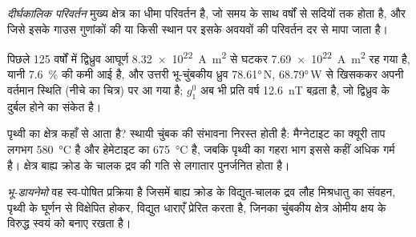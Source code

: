 \begin{definition}[दीर्घकालिक परिवर्तन]\label{def:b3:palaeomagnetism:secular}
\emph{दीर्घकालिक परिवर्तन} मुख्य क्षेत्र का धीमा परिवर्तन है, जो
समय के साथ वर्षों से सदियों तक होता है, और जिसे इसके गाउस गुणांकों की या
किसी स्थान पर इसके अवयवों की परिवर्तन दर से मापा जाता है।
\end{definition}

पिछले 125 वर्षों में द्विध्रुव आघूर्ण
\qty{8.32e22}{A.m^2} से घटकर \qty{7.69e22}{A.m^2} रह गया है, यानी \qty{7.6}{\percent} की कमी आई है, और उत्तरी भू-चुंबकीय ध्रुव
\ang{78.61}\,N, \ang{68.79}\,W से खिसककर अपनी
वर्तमान स्थिति (नीचे का चित्र) पर आ गया है; $g_1^0$ अब भी प्रति वर्ष \qty{12.6}{nT} बढ़ता है,
जो द्विध्रुव के दुर्बल होने का संकेत है।

\begin{omfigure}

\par{}\label{fig:b3:palaeomagnetism:dipole}
\end{omfigure}

पृथ्वी का क्षेत्र कहाँ से आता है? स्थायी चुंबक की संभावना निरस्त होती है: मैग्नेटाइट का
क्यूरी ताप लगभग \qty{580}{\celsius} है और हेमेटाइट का
\qty{675}{\celsius} है, जबकि पृथ्वी का गहरा भाग इससे कहीं अधिक गर्म है।
क्षेत्र बाह्य क्रोड के चालक द्रव की
गति से लगातार पुनर्जनित होता है।

\begin{definition}[भू-डायनेमो]\label{def:b3:palaeomagnetism:geodynamo}
\emph{भू-डायनेमो} वह स्व-पोषित प्रक्रिया है जिसमें
बाह्य क्रोड के विद्युत-चालक द्रव लौह मिश्रधातु का संवहन,
पृथ्वी के घूर्णन से विक्षेपित होकर, विद्युत धाराएँ प्रेरित करता है, जिनका चुंबकीय
क्षेत्र ओमीय क्षय के विरुद्ध स्वयं को बनाए रखता है।
\end{definition}

